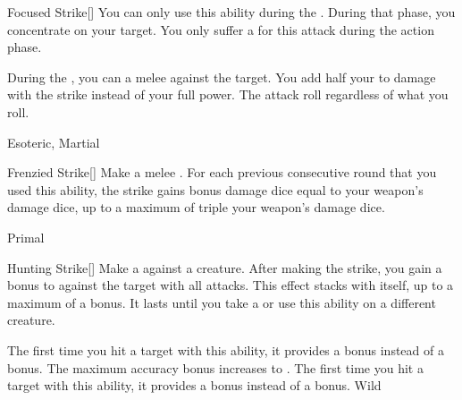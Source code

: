 \lowercase{\hypertarget{maneuver:Focused Strike}{}}\label{maneuver:Focused Strike}
\hypertarget{maneuver:Focused Strike}{}
\begin{freeability}[Rank 1]{Focused Strike}[]
You can only use this ability during the .
During that phase, you concentrate on your target.
You only suffer a  for this attack during the action phase.

During the , you can a melee  against the target.
You add half your  to damage with the strike instead of your full power.
The attack roll  regardless of what you roll.


 Esoteric, Martial
\end{freeability}
\vspace{0.25em}



\lowercase{\hypertarget{maneuver:Frenzied Strike}{}}\label{maneuver:Frenzied Strike}
\hypertarget{maneuver:Frenzied Strike}{}
\begin{freeability}[Rank 1]{Frenzied Strike}[]
Make a melee .
For each previous consecutive round that you used this ability, the strike gains bonus damage dice equal to your weapon's damage dice, up to a maximum of triple your weapon's damage dice.


 Primal
\end{freeability}
\vspace{0.25em}



\lowercase{\hypertarget{maneuver:Hunting Strike}{}}\label{maneuver:Hunting Strike}
\hypertarget{maneuver:Hunting Strike}{}
\begin{freeability}[Rank 1]{Hunting Strike}[]
Make a  against a creature.
After making the strike, you gain a  bonus to  against the target with all attacks.
This effect stacks with itself, up to a maximum of a  bonus.
It lasts until you take a  or use this ability on a different creature.

\rankline
{} The first time you hit a target with this ability, it provides a  bonus instead of a  bonus.
 The maximum accuracy bonus increases to .
 The first time you hit a target with this ability, it provides a  bonus instead of a  bonus.
 Wild
\end{freeability}
\vspace{0.25em}



